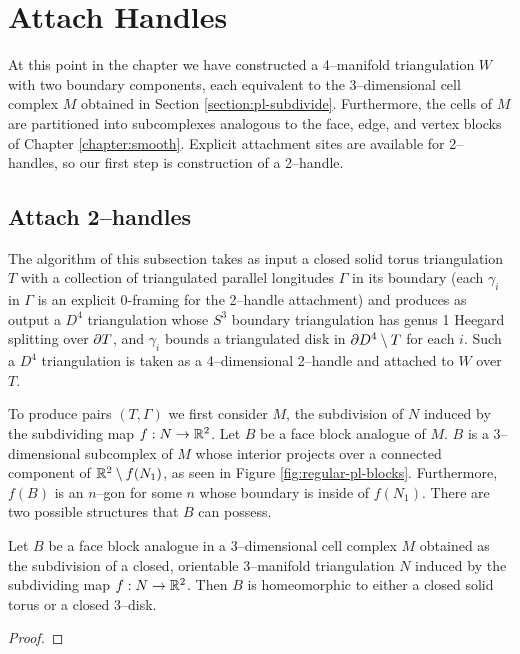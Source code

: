 \section{Attach Handles}
\label{section:pl-handle}

At this point in the chapter we have constructed a 4--manifold triangulation $W$ with two boundary components, each equivalent to the 3--dimensional cell complex $M$ obtained in Section \ref{section:pl-subdivide}.
Furthermore, the cells of $M$ are partitioned into subcomplexes analogous to the face, edge, and vertex blocks of Chapter \ref{chapter:smooth}.
Explicit attachment sites are available for 2--handles, so our first step is construction of a 2--handle.

\subsection{Attach 2--handles}
\label{section:pl-2-handle}

The algorithm of this subsection takes as input a closed solid torus triangulation $T$ with a collection of triangulated parallel longitudes $\Gamma$ in its boundary (each $\gamma_i$ in $\Gamma$ is an explicit 0-framing for the 2--handle attachment) and produces as output a $D^4$ triangulation whose $S^3$ boundary triangulation has genus 1 Heegard splitting over $\partial T$, and $\gamma_i$ bounds a triangulated disk in $\partial D^4\setminus T$ for each $i$.
Such a $D^4$ triangulation is taken as a 4--dimensional 2--handle and attached to $W$ over $T$.

To produce pairs $(T,\Gamma)$ we first consider $M$, the subdivision of $N$ induced by the subdividing map $f:N\to\mathbb{R}^2$.
Let $B$ be a face block analogue of $M$.
$B$ is a 3--dimensional subcomplex of $M$ whose interior projects over a connected component of $\mathbb{R}^2\setminus f(N_1)$, as seen in Figure \ref{fig:regular-pl-blocks}.
Furthermore, $f(B)$ is an $n$--gon for some $n$ whose boundary is inside of $f(N_1)$.
There are two possible structures that $B$ can possess.

\begin{lem}
	Let $B$ be a face block analogue in a 3--dimensional cell complex $M$ obtained as the subdivision of a closed, orientable 3--manifold triangulation $N$ induced by the subdividing map $f:N\to\mathbb{R}^2$.
	Then $B$ is homeomorphic to either a closed solid torus or a closed 3--disk.	
\end{lem}

\begin{proof}
		
\end{proof}

